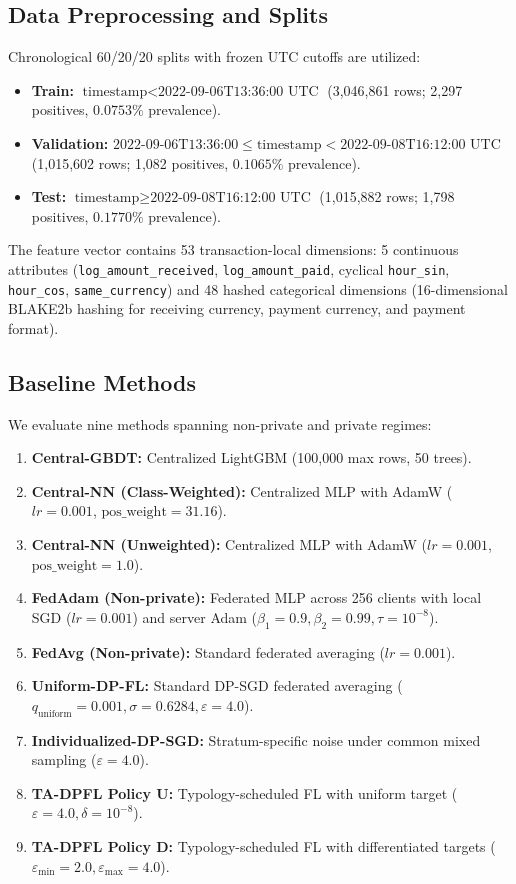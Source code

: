 \documentclass[conference]{IEEEtran}
\begin{document}
\subsection{Data Preprocessing and Splits}
Chronological 60/20/20 splits with frozen UTC cutoffs are utilized:
\begin{itemize}
    \item \textbf{Train:} $\text{timestamp} < \text{2022-09-06T13:36:00 UTC}$ (3,046,861 rows; 2,297 positives, $0.0753\%$ prevalence).
    \item \textbf{Validation:} $\text{2022-09-06T13:36:00} \le \text{timestamp} < \text{2022-09-08T16:12:00 UTC}$ (1,015,602 rows; 1,082 positives, $0.1065\%$ prevalence).
    \item \textbf{Test:} $\text{timestamp} \ge \text{2022-09-08T16:12:00 UTC}$ (1,015,882 rows; 1,798 positives, $0.1770\%$ prevalence).
\end{itemize}
The feature vector contains 53 transaction-local dimensions: 5 continuous attributes (\texttt{log\_amount\_received}, \texttt{log\_amount\_paid}, cyclical \texttt{hour\_sin}, \texttt{hour\_cos}, \texttt{same\_currency}) and 48 hashed categorical dimensions (16-dimensional BLAKE2b hashing for receiving currency, payment currency, and payment format).

\subsection{Baseline Methods}
We evaluate nine methods spanning non-private and private regimes:
\begin{enumerate}
    \item \textbf{Central-GBDT:} Centralized LightGBM (100,000 max rows, 50 trees).
    \item \textbf{Central-NN (Class-Weighted):} Centralized MLP with AdamW ($lr = 0.001$, $\text{pos\_weight} = 31.16$).
    \item \textbf{Central-NN (Unweighted):} Centralized MLP with AdamW ($lr = 0.001$, $\text{pos\_weight} = 1.0$).
    \item \textbf{FedAdam (Non-private):} Federated MLP across 256 clients with local SGD ($lr = 0.001$) and server Adam ($\beta_1=0.9, \beta_2=0.99, \tau=10^{-8}$).
    \item \textbf{FedAvg (Non-private):} Standard federated averaging ($lr = 0.001$).
    \item \textbf{Uniform-DP-FL:} Standard DP-SGD federated averaging ($q_{\text{uniform}} = 0.001, \sigma = 0.6284, \varepsilon = 4.0$).
    \item \textbf{Individualized-DP-SGD:} Stratum-specific noise under common mixed sampling ($\varepsilon = 4.0$).
    \item \textbf{TA-DPFL Policy U:} Typology-scheduled FL with uniform target ($\varepsilon = 4.0, \delta = 10^{-8}$).
    \item \textbf{TA-DPFL Policy D:} Typology-scheduled FL with differentiated targets ($\varepsilon_{\min} = 2.0, \varepsilon_{\max} = 4.0$).
\end{enumerate}
\end{document}

